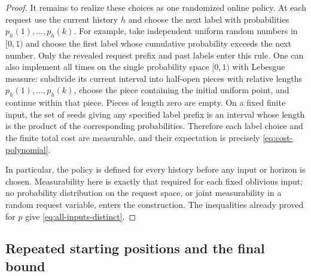 \begin{proof}
It remains to realize these choices as one randomized online policy.
At each request use the current history $h$ and choose the next label
with probabilities $p_h(1),\ldots,p_h(k)$.  For example, take
independent uniform random numbers in $[0,1)$ and choose the first
label whose cumulative probability exceeds the next number.  Only the
revealed request prefix and past labels enter this rule.
One can also implement all times on the single probability space
$[0,1)$ with Lebesgue measure: subdivide its current interval into
half-open pieces with relative lengths $p_h(1),\ldots,p_h(k)$, choose
the piece containing the initial uniform point, and continue within
that piece.  Pieces of length zero are empty.  On a fixed finite input,
the set of seeds giving any specified label prefix is an interval
whose length is the product of the corresponding probabilities.
Therefore each label choice and the finite total cost are measurable,
and their expectation is precisely \eqref{eq:cost-polynomial}.

In particular, the policy is defined for every history before any
input or horizon is chosen.  Measurability here is exactly that required
for each fixed oblivious input; no probability distribution on the
request space, or joint measurability in a random request variable,
enters the construction.  The inequalities already proved for $p$
give \eqref{eq:all-inputs-distinct}.
\end{proof}

\subsection{Repeated starting positions and the final bound}

